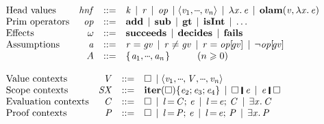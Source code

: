 \begin{figure}[t]
$$\begin{array}{l}
\begin{array}{lrcl@{}}
      \text{Head values} & \hnf & ::= & \ensuremath{\Varid{k}} \vb \ensuremath{\Varid{r}}  \vb \ensuremath{\Varid{op}} \vb \ensuremath{\langle\Varid{v}_{\mathrm{1}},\mydots,\Varid{v}_{\Varid{n}}\rangle} \vb \ensuremath{\lambda\Varid{x} .\,\Varid{e}}
             \vb \ensuremath{\textbf{olam}(\Varid{v},\lambda\Varid{x} .\,\Varid{e})}\\
      \text{Prim operators} & \ensuremath{\Varid{op}}  & ::= & \ensuremath{\textbf{add}} \vb \ensuremath{\textbf{sub}} \vb \ensuremath{\textbf{gt}} \vb \ensuremath{\textbf{isInt}} \vb \ldots \\
      \text{Effects} & \ensuremath{\omega} & ::= & \ensuremath{\textbf{succeeds}} \vb \ensuremath{\textbf{decides}} \vb \ensuremath{\textbf{fails}}  \\
      \text{Assumptions} & \ensuremath{\Varid{a}} & ::= & \ensuremath{\Varid{r}\mathrel{=}\Varid{gv}} \vb \ensuremath{\Varid{r}\not=\Varid{gv}} \vb \ensuremath{\Varid{r}\mathrel{=}\Varid{op} [\!\Varid{gv}]} \vb \ensuremath{\neg\Varid{op} [\!\Varid{gv}]} \\
      & \ensuremath{A} & ::= & \ensuremath{\{\mskip1.5mu \Varid{a}_{\mathrm{1}},\mydots,\Varid{a}_{\Varid{n}}\mskip1.5mu\}}   \hspace{1cm} (n \geq 0)
\end{array}
\\ \\
\begin{array}{lrcl}
\text{Value contexts}  & \ensuremath{\Conid{V}} & ::= & \hole \vb \ensuremath{\langle{}\Varid{v}_{\mathrm{1}},\mydots,\Conid{V},\mydots,\Varid{v}_{\Varid{n}}\rangle}\\
\text{Scope contexts}  & \ensuremath{\Conid{SX}} & ::= & \ensuremath{\textbf{iter}(\hole)\{\Varid{e}_{\mathrm{2}};\Varid{e}_{\mathrm{3}};\Varid{e}_{\mathrm{4}}\}} \vb \ensuremath{\hole\;\rule[-0.1em]{0.15em}{0.75em}\;\Varid{e}} \vb \ensuremath{\Varid{e}\;\rule[-0.1em]{0.15em}{0.75em}\;\hole} \\
\text{Evaluation contexts}  & \ensuremath{\Conid{C}} & ::= & \ensuremath{\hole} \vb \ensuremath{\Varid{l}\hspace{-0.14em}=\hspace{-0.14em}\Conid{C};\,\Varid{e}} \vb \ensuremath{\Varid{l}\hspace{-0.14em}=\hspace{-0.14em}\Varid{e};\,\Conid{C}} \vb \ensuremath{\exists\Varid{x}.\,\Conid{C}} \\
\text{Proof contexts}  & \ensuremath{\Conid{P}} & ::= & \ensuremath{\hole} \vb \ensuremath{\Varid{l}\hspace{-0.14em}=\hspace{-0.14em}\Conid{P};\,\Varid{e}} \vb \ensuremath{\Varid{l}\hspace{-0.14em}=\hspace{-0.14em}\Varid{e};\,\Conid{P}} \vb \ensuremath{\exists\Varid{x}.\,\Conid{P}}  \\

\end{array}
\end{array}$$
\end{figure}
